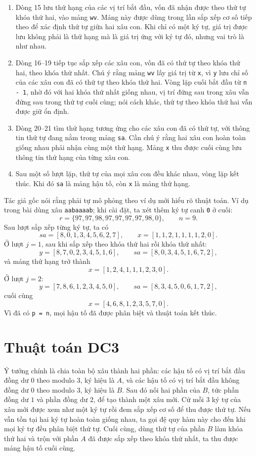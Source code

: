 \documentclass[11pt]{article}
\begin{document}
\begin{enumerate}
  \item Dòng 15 lưu thứ hạng của các vị trí bắt đầu, vốn đã nhận được theo thứ
  tự khóa thứ hai, vào mảng \texttt{wv}. Mảng này được dùng trong lần sắp xếp
  cơ số tiếp theo để xác định thứ tự giữa hai xâu con. Khi chỉ có một ký tự,
  giá trị được lưu không phải là thứ hạng mà là giá trị ứng với ký tự đó, nhưng
  vai trò là như nhau.

  \item Dòng 16--19 tiếp tục sắp xếp các xâu con, vốn đã có thứ tự theo khóa
  thứ hai, theo khóa thứ nhất. Chú ý rằng mảng \texttt{wv} lấy giá trị từ
  \texttt{x}, vì \texttt{y} lưu chỉ số của các xâu con đã có thứ tự theo khóa
  thứ hai. Vòng lặp cuối bắt đầu từ \texttt{n - 1}, nhờ đó với hai khóa thứ
  nhất giống nhau, vị trí đứng sau trong xâu vẫn đứng sau trong thứ tự cuối
  cùng; nói cách khác, thứ tự theo khóa thứ hai vẫn được giữ ổn định.

  \item Dòng 20--21 tìm thứ hạng tương ứng cho các xâu con đã có thứ tự, với
  thông tin thứ tự đang nằm trong mảng \texttt{sa}. Cần chú ý rằng hai xâu con
  hoàn toàn giống nhau phải nhận cùng một thứ hạng. Mảng \texttt{x} thu được
  cuối cùng lưu thông tin thứ hạng của từng xâu con.

  \item Sau một số lượt lặp, thứ tự của mọi xâu con đều khác nhau, vòng lặp
  kết thúc. Khi đó \texttt{sa} là mảng hậu tố, còn \texttt{x} là mảng thứ hạng.
\end{enumerate}

Tác giả gốc nói rằng phải tự mô phỏng theo ví dụ mới hiểu rõ thuật toán. Ví dụ
trong bài dùng xâu \texttt{aabaaaab}; khi cài đặt, ta xét thêm ký tự canh
\texttt{0} ở cuối:
\[
  r=\{97,97,98,97,97,97,97,98,0\},\qquad n=9.
\]
Sau lượt sắp xếp từng ký tự, ta có
\[
  sa=[8,0,1,3,4,5,6,2,7],
  \qquad
  x=[1,1,2,1,1,1,1,2,0].
\]
Ở lượt $j=1$, sau khi sắp xếp theo khóa thứ hai rồi khóa thứ nhất:
\[
  y=[8,7,0,2,3,4,5,1,6],
  \qquad
  sa=[8,0,3,4,5,1,6,7,2],
\]
và mảng thứ hạng trở thành
\[
  x=[1,2,4,1,1,1,2,3,0].
\]
Ở lượt $j=2$:
\[
  y=[7,8,6,1,2,3,4,5,0],
  \qquad
  sa=[8,3,4,5,0,6,1,7,2],
\]
cuối cùng
\[
  x=[4,6,8,1,2,3,5,7,0].
\]
Vì đã có \texttt{p = n}, mọi hậu tố đã được phân biệt và thuật toán kết thúc.

\section{Thuật toán DC3}

Ý tưởng chính là chia toàn bộ xâu thành hai phần: các hậu tố có vị trí bắt đầu
đồng dư $0$ theo modulo $3$, ký hiệu là $A$, và các hậu tố có vị trí bắt đầu
không đồng dư $0$ theo modulo $3$, ký hiệu là $B$. Sau đó nối hai phần của
$B$, tức phần đồng dư $1$ và phần đồng dư $2$, để tạo thành một xâu mới. Cứ
mỗi $3$ ký tự của xâu mới được xem như một ký tự rồi đem sắp xếp cơ số để thu
được thứ tự. Nếu vẫn tồn tại hai ký tự hoàn toàn giống nhau, ta gọi đệ quy hàm
này cho đến khi mọi ký tự đều phân biệt thứ tự. Cuối cùng, dùng thứ tự của
phần $B$ làm khóa thứ hai và trộn với phần $A$ đã được sắp xếp theo khóa thứ
nhất, ta thu được mảng hậu tố cuối cùng.
\end{document}
